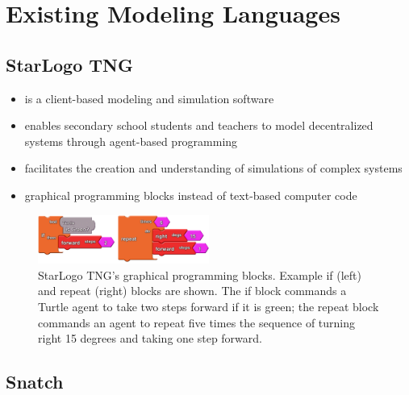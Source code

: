 \documentclass[runningheads,a4paper]{llncs}
\begin{document}
 \section{Existing Modeling Languages}
 
 \subsection{StarLogo TNG}

  \begin{itemize}
  \item is a client-based modeling and simulation software
  \item enables secondary school students and teachers to model decentralized systems through agent-based programming
  \item facilitates the creation and understanding of simulations of complex systems
  \item graphical programming blocks instead of text-based computer code
  \end{itemize}
  
  \begin{figure}[ht]
	\centering
  \includegraphics[width=0.5\textwidth]{images/StarLogoTNGBlocksEx.PNG}
	\caption{ StarLogo TNG’s graphical programming blocks. Example if (left) and repeat (right) blocks are shown. The
	  if block commands a Turtle agent to take two steps forward if it is green; the repeat block commands an agent to
	  repeat five times the sequence of turning right 15 degrees and taking one step forward.}
	\label{fig1}
  \end{figure}
  
   \subsection{Snatch}
\end{document}
